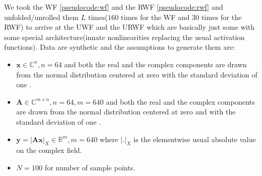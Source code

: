 We took the \ac{WF}\cite{Candes2014} \cref{pseudocode:wf} and the \ac{RWF}\cite{Zhang2016} \cref{pseudocode:rwf} and unfolded/unrolled them $L$ times($160$ times for the \ac{WF} 
and $30$ times for the \ac{RWF}) to arrive at the \ac{UWF} and the \ac{URWF} which are basically just some \nn\cite{Goodfellow2016}\cite{Bishop2006}\index{\nn} 
with some special architecture(innate nonlinearities replacing the usual activation functions). Data are synthetic and the assumptions to generate them are:
\begin{itemize}
  \item $\boldsymbol{x} \in \mathbb{C}^{n}, n=64$ and both the real and the complex components are drawn from the normal distribution 
  centered at zero with the standard deviation of one \cite{Candes2014}\cite{Zhang2016}.
  \item $\boldsymbol{A} \in \mathbb{C}^{m \times n}, n=64, m=640$ and both the real and the complex components are drawn from the normal distribution 
  centered at zero and with the standard deviation of one \cite{Candes2014}\cite{Zhang2016}.
  \item $\boldsymbol{y}= \left|\boldsymbol{A}\boldsymbol{x}\right|_{X} \in \mathbb{R}^m, m=640$ where $\left|\boldsymbol{.}\right|_X$ is the elementwise usual absolute value on the complex field.
  \item $N=100$ for number of sample points. 
\end{itemize}

